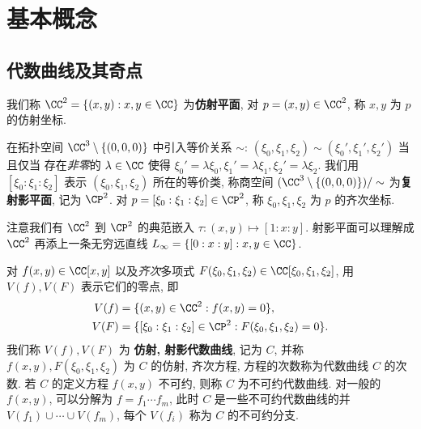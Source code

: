 \chapter{基本概念}
\label{chap:chap-2}

\fontsize{12bp}{14.4pt}

\section{代数曲线及其奇点}

\begin{defin}[仿射平面]
\label{defin:affine-plane}
我们称 $\CC^2 = \{(x,y): x,y \in \CC\}$ 为\textbf{仿射平面},
对 $p = (x,y) \in \CC^2$, 称 $x,y$ 为 $p$ 的仿射坐标.
\end{defin}

\begin{defin}[射影平面]
\label{defin:projective-plane}
在拓扑空间 $\CC^3 \setminus \{(0,0,0)\}$ 中引入等价关系 $\sim$:
$(\xi_0,\xi_1,\xi_2) \sim (\xi_0',\xi_1',\xi_2')$ 当且仅当
存在\textit{非零}的 $\lambda \in \CC$ 使得
$\xi_0' = \lambda\xi_0, \xi_1' = \lambda\xi_1, \xi_2' = \lambda\xi_2$.
我们用 $[\xi_0:\xi_1:\xi_2]$ 表示 $(\xi_0,\xi_1,\xi_2)$ 所在的等价类,
称商空间 $(\CC^3\setminus \{(0,0,0)\})/ \sim$ 为\textbf{复射影平面},
记为 $\CP^2$. 对 $p = [\xi_0:\xi_1:\xi_2] \in \CP^2$,
称 $\xi_0, \xi_1, \xi_2$ 为 $p$ 的齐次坐标.
\end{defin}

注意我们有 $\CC^2$ 到 $\CP^2$ 的典范嵌入
$\tau: (x,y) \mapsto [1:x:y]$.
射影平面可以理解成 $\CC^2$ 再添上一条无穷远直线
$L_\infty = \{[0:x:y]: x,y \in \CC\}$.

\begin{defin}[代数曲线]
\label{defin:algebraic-curve}
对 $f(x,y) \in \CC[x,y]$ 以及\textit{齐次}多项式
$F(\xi_0,\xi_1,\xi_2) \in \CC[\xi_0,\xi_1,\xi_2]$,
用 $V(f), V(F)$ 表示它们的零点, 即
\begin{align*}
V(f) &= \{(x,y) \in \CC^2: f(x,y) = 0\},\\
V(F) &= \{[\xi_0:\xi_1:\xi_2] \in \CP^2: F(\xi_0,\xi_1,\xi_2) = 0\}.
\end{align*}
我们称 $V(f), V(F)$ 为 \textbf{仿射, 射影代数曲线}, 记为 $C$,
并称 $f(x,y), F(\xi_0,\xi_1,\xi_2)$ 为 $C$ 的仿射, 齐次方程,
方程的次数称为代数曲线 $C$ 的次数.
若 $C$ 的定义方程 $f(x,y)$ 不可约, 则称 $C$ 为不可约代数曲线.
对一般的 $f(x,y)$, 可以分解为 $f = f_1\cdots f_m$,
此时 $C$ 是一些不可约代数曲线的并 $V(f_1)\cup \cdots \cup V(f_m)$,
每个 $V(f_i)$ 称为 $C$ 的不可约分支.
\end{defin}

